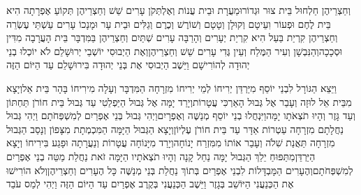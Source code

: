 \documentclass[../main/main.tex]{subfiles}
\begin{document}
\begin{multicols*}{\ncols}
וְחַצְרֵיהֶן \ClosedSection{}חַלְחוּל בֵּית צוּר וּגְדוֹר\PreVerseSpace{}וּמַעֲרָת וּבֵית עֲנוֹת וְאֶלְתְּקֹן עָרִים שֵׁשׁ וְחַצְרֵיהֶן תְּקוֹעַ אֶפְרָתָה הִיא בֵּית לֶחֶם וּפְעוֹר וִעֵיטָם וְקוּלָן וְטָטָם וְשׁוֹרֶשׁ וְכֶרֶם וְגַלִּים וּבֵית עָר וּמָנָכוֹ עָרִים עַשְׁתֵּי עֶשְׂרֵה וְחַצְרֵיהֶן\OmitEnd{} \ClosedSection{}קִרְיַת בַּעַל הִיא קִרְיַת יְעָרִים וְהָרַבָּה עָרִים שְׁתַּיִם וְחַצְרֵיהֶן \ClosedSection{}בַּמִּדְבָּר בֵּית הָעֲרָבָה מִדִּין וּסְכָכָה\PreVerseSpace{}וְהַנִּבְשָׁן וְעִיר הַמֶּלַח וְעֵין גֶּדִי עָרִים שֵׁשׁ וְחַצְרֵיהֶן\PreVerseSpace{}וְאֶת הַיְבוּסִי יוֹשְׁבֵי יְרוּשָׁלֵם לֹא יוֹכְלוּ בְנֵי יְהוּדָה לְהוֹרִישָׁם וַיֵּשֶׁב הַיְבוּסִי אֶת בְּנֵי יְהוּדָה בִּירוּשָׁלֵם עַד הַיּוֹם הַזֶּה\OpenSection{}\par
{}וַיֵּצֵא הַגּוֹרָל לִבְנֵי יוֹסֵף מִיַּרְדֵּן יְרִיחוֹ לְמֵי יְרִיחוֹ מִזְרָחָה הַמִּדְבָּר וְעָלָה\SubEnd{} מִירִיחוֹ בָּהָר בֵּית אֵל\PreVerseSpace{}וְיָצָא מִבֵּית אֵל לוּזָה וְעָבַר אֶל גְּבוּל הָאַרְכִּי עֲטָרוֹת\PreVerseSpace{}וְיָרַד יָמָּה אֶל גְּבוּל הַיַּפְלֵטִי עַד גְּבוּל בֵּית חוֹרֹן תַּחְתּוֹן וְעַד גָּזֶר וְהָיוּ תֹצְאֹתָו יָמָּה\PreVerseSpace{}וַיִּנְחֲלוּ בְנֵי יוֹסֵף מְנַשֶּׁה וְאֶפְרָיִם\PreVerseSpace{}וַיְהִי גְּבוּל בְּנֵי אֶפְרַיִם לְמִשְׁפְּחֹתָם וַיְהִי גְּבוּל נַחֲלָתָם מִזְרָחָה עַטְרוֹת אַדָּר עַד בֵּית חוֹרֹן עֶלְיוֹן\PreVerseSpace{}וְיָצָא הַגְּבוּל הַיָּמָּה הַמִּכְמְתָת מִצָּפוֹן וְנָסַב הַגְּבוּל מִזְרָחָה תַּאֲנַת שִׁלֹה וְעָבַר אוֹתוֹ מִמִּזְרַח יָנוֹחָה\PreVerseSpace{}וְיָרַד מִיָּנוֹחָה עֲטָרוֹת וְנַעֲרָתָה וּפָגַע בִּירִיחוֹ וְיָצָא הַיַּרְדֵּן\PreVerseSpace{}מִתַּפּוּחַ יֵלֵךְ הַגְּבוּל יָמָּה נַחַל קָנָה וְהָיוּ תֹצְאֹתָיו הַיָּמָּה זֹאת נַחֲלַת מַטֵּה בְנֵי אֶפְרַיִם לְמִשְׁפְּחֹתָם\PreVerseSpace{}וְהֶעָרִים הַמָּבְדָּלוֹת לִבְנֵי אֶפְרַיִם בְּתוֹךְ נַחֲלַת בְּנֵי מְנַשֶּׁה כָּל הֶעָרִים וְחַצְרֵיהֶן\PreVerseSpace{}וְלֹא הוֹרִישׁוּ אֶת הַכְּנַעֲנִי הַיּוֹשֵׁב בְּגָזֶר וַיֵּשֶׁב הַכְּנַעֲנִי בְּקֶרֶב אֶפְרַיִם עַד הַיּוֹם הַזֶּה וַיְהִי לְמַס עֹבֵד\OpenSection{}\par

\end{multicols*}
\end{document}
